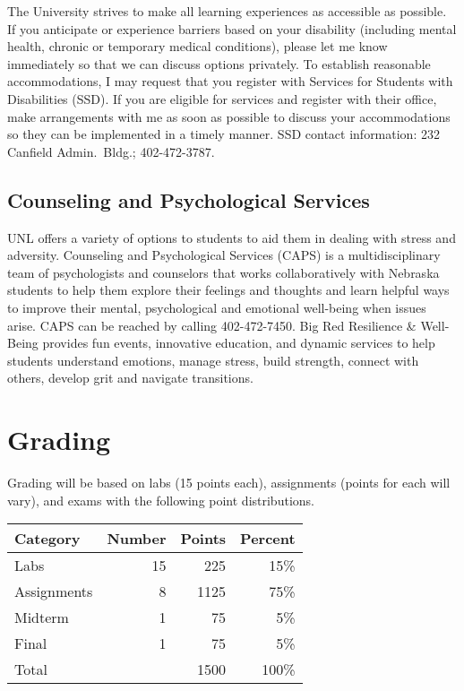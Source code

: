 \documentclass[12pt]{scrartcl}
\begin{document}
The University strives to make all learning experiences as accessible 
as possible. If you anticipate or experience barriers based on your 
disability (including mental health, chronic or temporary medical 
conditions), please let me know immediately so that we can discuss 
options privately. To establish reasonable accommodations, I may 
request that you register with Services for Students with Disabilities 
(SSD). If you are eligible for services and register with their office, 
make arrangements with me as soon as possible to discuss your 
accommodations so they can be implemented in a timely manner.
SSD contact information: 232 Canfield Admin.\ Bldg.; 402-472-3787.

\subsection{Counseling and Psychological Services}

UNL offers a variety of options to students to aid them in 
dealing with stress and adversity.  Counseling and Psychological 
Services (CAPS) is a multidisciplinary team of psychologists and 
counselors that works collaboratively with Nebraska students to 
help them explore their feelings and thoughts and learn helpful 
ways to improve their mental, psychological and emotional 
well-being when issues arise. CAPS can be reached by calling 
402-472-7450. Big Red Resilience \& Well-Being provides fun 
events, innovative education, and dynamic services to help 
students understand emotions, manage stress, build strength, 
connect with others, develop grit and navigate transitions.

\section{Grading}

Grading will be based on labs (15 points each), assignments (points
for each will vary), and exams with the following point distributions.

\begin{table}[h]
\centering
\begin{tabular}{lrrr}
Category & Number & Points & Percent \\
\hline\hline
Labs        & 15 & 225 & 15\% \\
Assignments & 8  & 1125 & 75\% \\
Midterm     & 1  & 75 & 5\% \\
Final       & 1  & 75 & 5\% \\
\hline
Total & ~ & 1500 & 100\% 
\end{tabular}
\end{table}
\end{document}

